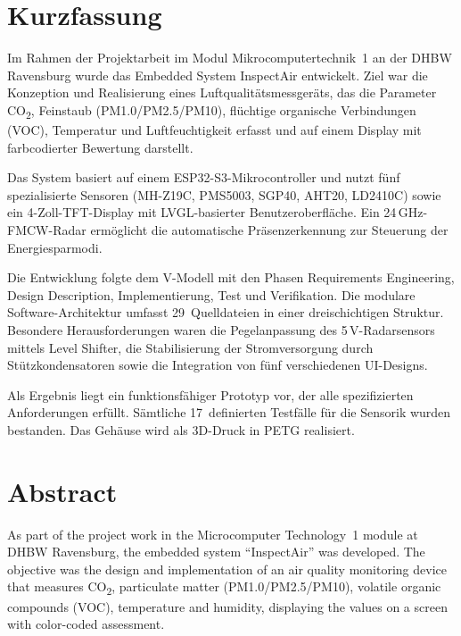 \chapter*{Kurzfassung}

Im Rahmen der Projektarbeit im Modul Mikrocomputertechnik~1 an der DHBW Ravensburg wurde das Embedded System \glqq InspectAir\grqq{} entwickelt. Ziel war die Konzeption und Realisierung eines Luftqualitätsmessgeräts, das die Parameter CO\textsubscript{2}, Feinstaub (PM1.0/PM2.5/PM10), flüchtige organische Verbindungen (VOC), Temperatur und Luftfeuchtigkeit erfasst und auf einem Display mit farbcodierter Bewertung darstellt.

Das System basiert auf einem ESP32-S3-Mikrocontroller und nutzt fünf spezialisierte Sensoren (MH-Z19C, PMS5003, SGP40, AHT20, LD2410C) sowie ein 4-Zoll-TFT-Display mit LVGL-basierter Benutzeroberfläche. Ein 24\,GHz-FMCW-Radar ermöglicht die automatische Präsenzerkennung zur Steuerung der Energiesparmodi.

Die Entwicklung folgte dem V-Modell mit den Phasen Requirements Engineering, Design Description, Implementierung, Test und Verifikation. Die modulare Software-Architektur umfasst 29~Quelldateien in einer dreischichtigen Struktur. Besondere Herausforderungen waren die Pegelanpassung des 5\,V-Radarsensors mittels Level Shifter, die Stabilisierung der Stromversorgung durch Stützkondensatoren sowie die Integration von fünf verschiedenen UI-Designs.

Als Ergebnis liegt ein funktionsfähiger Prototyp vor, der alle spezifizierten Anforderungen erfüllt. Sämtliche 17~definierten Testfälle für die Sensorik wurden bestanden. Das Gehäuse wird als 3D-Druck in PETG realisiert.

\clearpage

\chapter*{Abstract}

As part of the project work in the Microcomputer Technology~1 module at DHBW Ravensburg, the embedded system ``InspectAir'' was developed. The objective was the design and implementation of an air quality monitoring device that measures CO\textsubscript{2}, particulate matter (PM1.0/PM2.5/PM10), volatile organic compounds (VOC), temperature and humidity, displaying the values on a screen with color-coded assessment.

